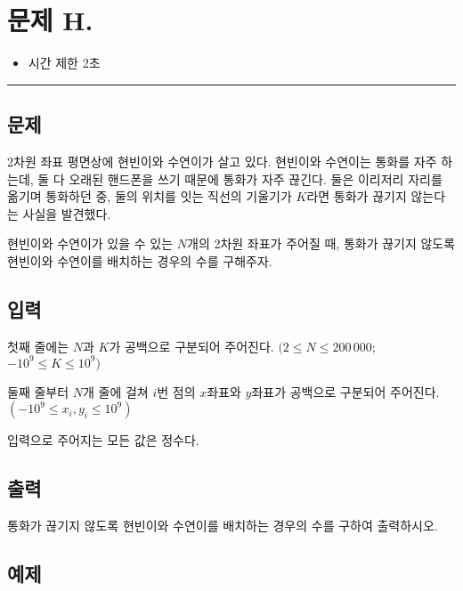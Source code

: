 \newpage
\section*{{\Large 문제 H.} }

\begin{itemize}
    \item 시간 제한 \tabto{2cm} 2초
\end{itemize}

\hrule

\subsection*{문제}

2차원 좌표 평면상에 현빈이와 수연이가 살고 있다. 현빈이와 수연이는 통화를 자주 하는데, 둘 다 오래된 핸드폰을 쓰기 때문에 통화가 자주 끊긴다. 둘은 이리저리 자리를 옮기며 통화하던 중, 둘의 위치를 잇는 직선의 기울기가 $K$라면 통화가 끊기지 않는다는 사실을 발견했다.

현빈이와 수연이가 있을 수 있는 $N$개의 2차원 좌표가 주어질 때, 통화가 끊기지 않도록 현빈이와 수연이를 배치하는 경우의 수를 구해주자.

\subsection*{입력}

첫째 줄에는 $N$과 $K$가 공백으로 구분되어 주어진다. $(2\leq N\leq 200\,000;$ $-10^{9}\leq K \leq 10^{9})$

둘째 줄부터 $N$개 줄에 걸쳐 $i$번 점의 $x$좌표와 $y$좌표가 공백으로 구분되어 주어진다. $(-10^{9}\leq x_{i},y_{i} \leq 10^{9})$

입력으로 주어지는 모든 값은 정수다.

\subsection*{출력}

통화가 끊기지 않도록 현빈이와 수연이를 배치하는 경우의 수를 구하여 출력하시오.

\subsection*{예제}

